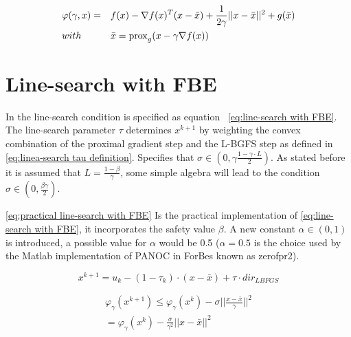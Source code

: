 %		
		\begin{equation}
			\begin{aligned}	
				& \varphi(\gamma,x)= 
				&& f(x) - \nabla f(x)^T(x-\bar{x}) + \frac{1}{2 \gamma}||x-\bar{x}||^2  + g(\bar{x})
				\\
				& with 
				&&\bar{x} = \operatorname{prox}_g( x - \gamma\nabla f(x)) 
			\end{aligned} 
			\label{eq:practical implementation of FBE}
		\end{equation}
		
	
	\section{Line-search with FBE}
	In \cite{LorenzoStella2017} the line-search condition is specified as equation ~\eqref{eq:line-search with FBE}. The line-search parameter $\tau$ determines $x^{k+1}$ by weighting the convex combination of the proximal gradient step and the L-BGFS step as defined in \eqref{eq:linea-search tau definition}.  \cite{LorenzoStella2017} Specifies that $\sigma \in (0, \gamma \frac{1-\gamma\cdot L}{2})$. As stated before it is assumed that $L=\frac{1-\beta}{\gamma}$, some simple algebra will lead to the condition $\sigma \in (0,\frac{\beta \gamma}{2})$.
	
	 \eqref{eq:practical line-search with FBE} Is the practical implementation of \eqref{eq:line-search with FBE}, it incorporates the safety value $\beta$. A new constant $\alpha \in (0,1)$ is introduced, a possible value for $\alpha$ would be 0.5 ($\alpha=0.5$ is the choice used by the Matlab implementation of PANOC in ForBes known as zerofpr2).
	
	\begin{equation}
		x^{k+1} = u_k - (1-\tau_k)\cdot (x-\bar{x}) + \tau \cdot dir_{LBFGS}
		\label{eq:linea-search tau definition}
	\end{equation}
	
	\begin{eqnarray}
		\label{eq:line-search with FBE}
		\varphi_{\gamma}(x^{k+1})\leq\varphi_{\gamma}(x^{k}) - \sigma ||\frac{x-\bar{x}}{\gamma}||^2 \\
		=
		\varphi_{\gamma}(x^{k}) - \frac{\sigma}{\gamma^2} ||x-\bar{x}||^2
	\end{eqnarray}
	
